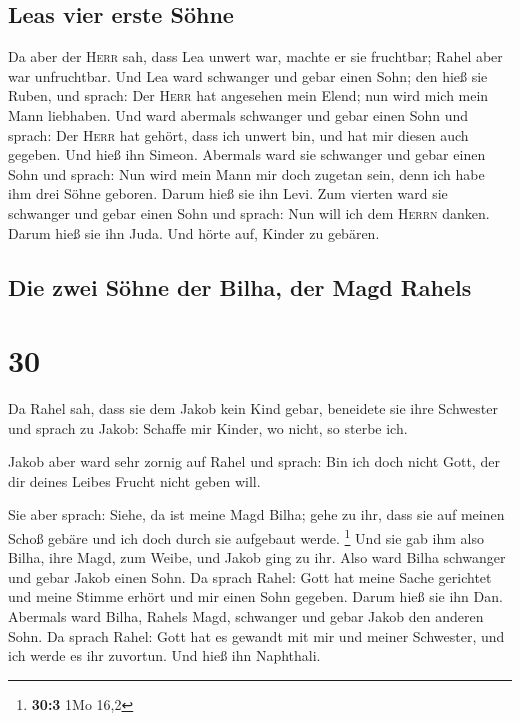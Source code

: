 \hypertarget{leas-vier-erste-suxf6hne}{%
\subsection{Leas vier erste Söhne}\label{leas-vier-erste-suxf6hne}}

 Da aber der \textsc{Herr} sah, dass Lea unwert war,
machte er sie fruchtbar; Rahel aber war unfruchtbar.  Und
Lea ward schwanger und gebar einen Sohn; den hieß sie Ruben, und sprach:
Der \textsc{Herr} hat angesehen mein Elend; nun wird mich mein Mann
liebhaben.  Und ward abermals schwanger und gebar einen
Sohn und sprach: Der \textsc{Herr} hat gehört, dass ich unwert bin, und
hat mir diesen auch gegeben. Und hieß ihn Simeon. 
Abermals ward sie schwanger und gebar einen Sohn und sprach: Nun wird
mein Mann mir doch zugetan sein, denn ich habe ihm drei Söhne geboren.
Darum hieß sie ihn Levi.  Zum vierten ward sie schwanger
und gebar einen Sohn und sprach: Nun will ich dem \textsc{Herrn} danken.
Darum hieß sie ihn Juda. Und hörte auf, Kinder zu gebären.

\hypertarget{die-zwei-suxf6hne-der-bilha-der-magd-rahels}{%
\subsection{Die zwei Söhne der Bilha, der Magd
Rahels}\label{die-zwei-suxf6hne-der-bilha-der-magd-rahels}}

\hypertarget{section-29}{%
\section{30}\label{section-29}}

 Da Rahel sah, dass sie dem Jakob kein Kind gebar,
beneidete sie ihre Schwester und sprach zu Jakob: Schaffe mir Kinder, wo
nicht, so sterbe ich.

 Jakob aber ward sehr zornig auf Rahel und sprach: Bin ich
doch nicht Gott, der dir deines Leibes Frucht nicht geben will.

 Sie aber sprach: Siehe, da ist meine Magd Bilha; gehe zu
ihr, dass sie auf meinen Schoß gebäre und ich doch durch sie aufgebaut
werde. \footnote{\textbf{30:3} 1Mo 16,2}  Und sie gab ihm
also Bilha, ihre Magd, zum Weibe, und Jakob ging zu ihr. 
Also ward Bilha schwanger und gebar Jakob einen Sohn.  Da
sprach Rahel: Gott hat meine Sache gerichtet und meine Stimme erhört und
mir einen Sohn gegeben. Darum hieß sie ihn Dan.  Abermals
ward Bilha, Rahels Magd, schwanger und gebar Jakob den anderen Sohn.
 Da sprach Rahel: Gott hat es gewandt mit mir und meiner
Schwester, und ich werde es ihr zuvortun. Und hieß ihn Naphthali.

